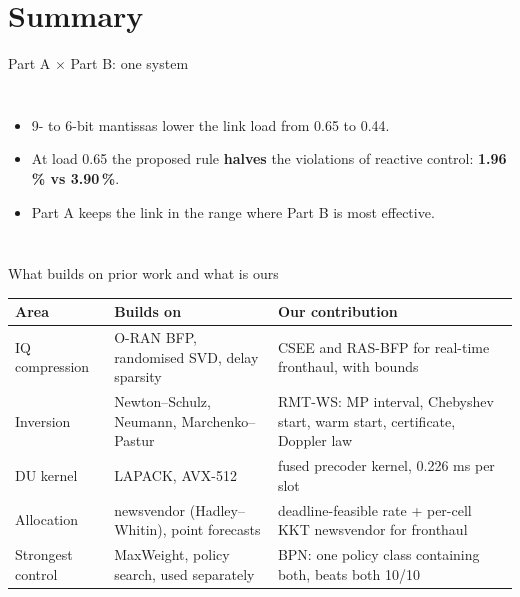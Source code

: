\documentclass[aspectratio=169,11pt]{beamer}
\begin{document}
\section{Summary}
\begin{frame}{Part A $\times$ Part B: one system}
\begin{columns}[c]
\centering
{}
\begin{itemize}
  \item 9- to 6-bit mantissas lower the link load from 0.65 to 0.44.
  \item At load 0.65 the proposed rule \textbf{halves} the violations of reactive control: \textbf{1.96\,\% vs 3.90\,\%}.
  \item Part A keeps the link in the range where Part B is most effective.
\end{itemize}
\end{columns}
\end{frame}

\begin{frame}{What builds on prior work and what is ours}
\footnotesize
\renewcommand{\arraystretch}{1.15}
\begin{tabular}{>{\raggedright\arraybackslash}p{2.4cm}>{\raggedright\arraybackslash}p{5.0cm}>{\raggedright\arraybackslash}p{6.6cm}}
\toprule
Area & Builds on & Our contribution \\
\midrule
IQ compression & O-RAN BFP, randomised SVD, delay sparsity & CSEE and RAS-BFP for real-time fronthaul, with bounds \\
Inversion & Newton--Schulz, Neumann, Marchenko--Pastur & RMT-WS: MP interval, Chebyshev start, warm start, certificate, Doppler law \\
DU kernel & LAPACK, AVX-512 & fused precoder kernel, 0.226 ms per slot \\
Allocation & newsvendor (Hadley--Whitin), point forecasts & deadline-feasible rate + per-cell KKT newsvendor for fronthaul \\
Strongest control & MaxWeight, policy search, used separately & BPN: one policy class containing both, beats both 10/10 \\
\bottomrule
\end{tabular}
\end{frame}
\end{document}
